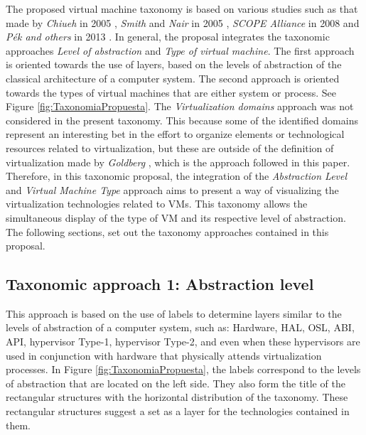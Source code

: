 	
	The proposed virtual machine taxonomy is based on various studies such as that made by \textit{Chiueh} in 2005 \cite{Chiueh2005}, \textit{Smith} and \textit{Nair} in 2005 \cite{Smith2005}, \textit{SCOPE Alliance} in 2008 \cite{SCOPEAlliance2008} and \textit{Pék and others} in 2013 \cite{Pek2013}. In general, the proposal integrates the taxonomic approaches \textit{Level of abstraction} and \textit{Type of virtual machine}. The first approach is oriented towards the use of layers, based on the levels of abstraction of the classical architecture of a computer system. The second approach is oriented towards the types of virtual machines that are either system or process. See Figure \ref{fig:TaxonomiaPropuesta}. The \textit{Virtualization domains} approach was not considered in the present taxonomy.  This because some of the identified domains represent an interesting bet in the effort to organize elements or technological resources related to virtualization, but these are outside of the definition of virtualization made by \textit{Goldberg} \cite{Goldberg1973}, which is the approach followed in this paper. Therefore, in this taxonomic proposal, the integration of the \textit{Abstraction Level} and \textit{Virtual Machine Type} approach aims to present a way of visualizing the virtualization technologies related to VMs. This taxonomy allows the simultaneous display of the type of VM and its respective level of abstraction. The following sections, set out the taxonomy approaches contained in this proposal.
	
	\subsection{Taxonomic approach 1: Abstraction level}

	This approach is based on the use of labels to determine layers similar to the levels of abstraction of a computer system, such as: Hardware, HAL, OSL, ABI, API, hypervisor Type-1, hypervisor Type-2, and even when these hypervisors are used in conjunction with hardware that physically attends virtualization processes. In Figure \ref{fig:TaxonomiaPropuesta}, the labels correspond to the levels of abstraction that are located on the left side. They also form the title of the rectangular structures with the horizontal distribution of the taxonomy. These rectangular structures suggest a set as a layer for the technologies contained in them.
	
